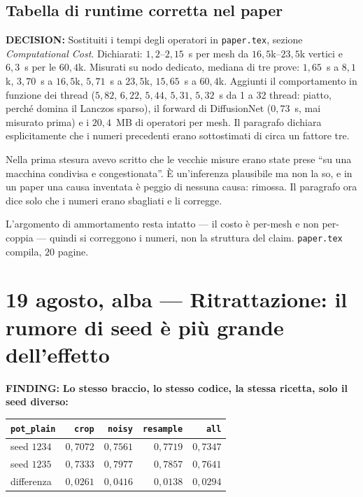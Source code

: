 \documentclass[11pt,a4paper]{article}
\newcommand{\finding}[1]{\textcolor{finding}{\textbf{FINDING:}} #1}
\newcommand{\decision}[1]{\textcolor{decision}{\textbf{DECISION:}} #1}
\begin{document}
\subsection*{Tabella di runtime corretta nel paper}

\decision{Sostituiti i tempi degli operatori in \texttt{paper.tex}, sezione
\emph{Computational Cost}. Dichiarati: $1{,}2$--$2{,}15$~s per mesh da $16{,}5$k--$23{,}5$k
vertici e $6{,}3$~s per le $60{,}4$k. Misurati su nodo dedicato, mediana di tre prove:
$1{,}65$~s a $8{,}1$k, $3{,}70$~s a $16{,}5$k, $5{,}71$~s a $23{,}5$k, $15{,}65$~s a $60{,}4$k.
Aggiunti il comportamento in funzione dei thread ($5{,}82$, $6{,}22$, $5{,}44$, $5{,}31$,
$5{,}32$~s da 1 a 32 thread: piatto, perch\'e domina il Lanczos sparso), il forward di
DiffusionNet ($0{,}73$~s, mai misurato prima) e i $20{,}4$~MB di operatori per mesh.
Il paragrafo dichiara esplicitamente che i numeri precedenti erano sottostimati di circa un
fattore tre.}

Nella prima stesura avevo scritto che le vecchie misure erano state prese ``su una macchina
condivisa e congestionata''. \`E un'inferenza plausibile ma non la so, e in un paper una causa
inventata \`e peggio di nessuna causa: rimossa. Il paragrafo ora dice solo che i numeri erano
sbagliati e li corregge.

L'argomento di ammortamento resta intatto --- il costo \`e per-mesh e non per-coppia --- quindi
si correggono i numeri, non la struttura del claim. \texttt{paper.tex} compila, $20$ pagine.


\section{19 agosto, alba --- Ritrattazione: il rumore di seed \`e pi\`u grande dell'effetto}

\finding{\textbf{Lo stesso braccio, lo stesso codice, la stessa ricetta, solo il seed diverso:}}

\begin{center}\small
\begin{tabular}{lrrrr}
\toprule
\texttt{pot\_plain} & \texttt{crop} & \texttt{noisy} & \texttt{resample} & \texttt{all} \\
\midrule
seed $1234$ & $0{,}7072$ & $0{,}7561$ & $0{,}7719$ & $0{,}7347$ \\
seed $1235$ & $0{,}7333$ & $0{,}7977$ & $0{,}7857$ & $0{,}7641$ \\
\midrule
differenza  & $0{,}0261$ & $0{,}0416$ & $0{,}0138$ & $0{,}0294$ \\
\bottomrule
\end{tabular}
\end{center}
\end{document}

